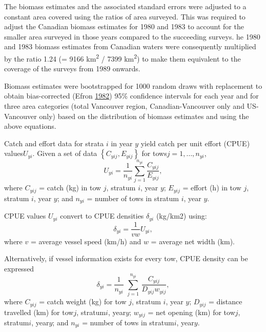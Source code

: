 \documentclass[11pt]{book}
\begin{document}
The biomass estimates and the associated standard errors were adjusted to a constant area covered using the ratios of area surveyed. This was required to adjust the Canadian biomass estimates for 1980 and 1983 to account for the smaller area surveyed in those years compared to the succeeding surveys. he 1980 and 1983 biomass estimates from Canadian waters were consequently multiplied by the ratio 1.24 (= 9166 km\textsuperscript{2} / 7399 km\textsuperscript{2}) to make them equivalent to the coverage of the surveys from 1989 onwards.

Biomass estimates were bootstrapped for 1000 random draws with replacement to obtain bias-corrected (Efron \protect\hyperlink{ref-efron1982}{1982}) 95\% confidence intervals for each year and for three area categories (total Vancouver region, Canadian-Vancouver only and US-Vancouver only) based on the distribution of biomass estimates and using the above equations.

Catch and effort data for strata \(i\) in year \(y\) yield catch per unit effort (CPUE) values\({U_{yi}}\). Given a set of data \(\left\{ {{C_{yij}},{E_{yij}}} \right\}\) for tows\(j = 1, \ldots ,{n_{yi}}\),
\begin{equation}
{U_{yi}} = \frac{1}{{{n_{yi}}}}\sum\limits_{j = 1}^{{n_{yi}}} {\frac{{{C_{yij}}}}{{{E_{yij}}}}},
\end{equation}
where \({C_{yij}}\) = catch (kg) in tow \(j\), stratum \(i\), year \(y\); \({E_{yij}}\) = effort (h) in tow \(j\), stratum \(i\), year \(y\); and \({n_{yi}}\) = number of tows in stratum \(i\), year \(y\).

CPUE values \({U_{yi}}\) convert to CPUE densities \({\delta _{yi}}\) (kg/km2) using:
\begin{equation}
{\delta _{yi}} = \frac{1}{{vw}}{U_{yi}},
\end{equation}
where \(v\) = average vessel speed (km/h) and \(w\) = average net width (km).

Alternatively, if vessel information exists for every tow, CPUE density can be expressed
\begin{equation}
{\delta _{yi}} = \frac{1}{{{n_{yi}}}}\,\,\sum\limits_{j = 1}^{{n_{yi}}} {\,\frac{{{C_{yij}}}}{{{D_{yij}}{w_{yij}}}}},
\end{equation}
where \({C_{yij}}\) = catch weight (kg) for tow \(j\), stratum \(i\), year \(y\); \({D_{yij}}\) = distance travelled (km) for tow\(j\), stratum\(i\), year\(y\); \({w_{yij}}\) = net opening (km) for tow\(j\), stratum\(i\), year\(y\); and \({n_{yi}}\) = number of tows in stratum\(i\), year\(y\).
\end{document}
